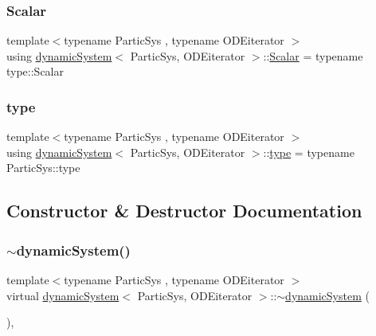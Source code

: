 \subsubsection{\texorpdfstring{Scalar}{Scalar}}
{\footnotesize\ttfamily template$<$typename Partic\+Sys , typename O\+D\+Eiterator $>$ \\
using \mbox{\hyperlink{classdynamic_system}{dynamic\+System}}$<$ Partic\+Sys, O\+D\+Eiterator $>$\+::\mbox{\hyperlink{classdynamic_system_a6eb7b06a4ee5721a1ee0855a854c3431}{Scalar}} =  typename type\+::\+Scalar}

\mbox{\label{classdynamic_system_a518990ebef8f3f6257e6ef0e49fe013e}} 
\subsubsection{\texorpdfstring{type}{type}}
{\footnotesize\ttfamily template$<$typename Partic\+Sys , typename O\+D\+Eiterator $>$ \\
using \mbox{\hyperlink{classdynamic_system}{dynamic\+System}}$<$ Partic\+Sys, O\+D\+Eiterator $>$\+::\mbox{\hyperlink{classdynamic_system_a518990ebef8f3f6257e6ef0e49fe013e}{type}} =  typename Partic\+Sys\+::type}



\subsection{Constructor \& Destructor Documentation}
\mbox{\label{classdynamic_system_a239af38fcf35f3fe32d5ae5e183e4cca}} 
\subsubsection{\texorpdfstring{$\sim$dynamic\+System()}{~dynamicSystem()}}
{\footnotesize\ttfamily template$<$typename Partic\+Sys , typename O\+D\+Eiterator $>$ \\
virtual \mbox{\hyperlink{classdynamic_system}{dynamic\+System}}$<$ Partic\+Sys, O\+D\+Eiterator $>$\+::$\sim$\mbox{\hyperlink{classdynamic_system}{dynamic\+System}} (\begin{DoxyParamCaption}{ }\end{DoxyParamCaption})\hspace{0.3cm}{\ttfamily [inline]}, {\ttfamily [virtual]}}



